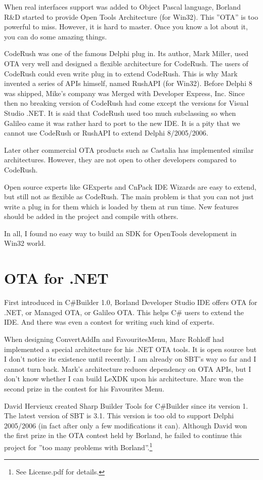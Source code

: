 When real interfaces support was added to Object Pascal language, Borland R\&D
started to provide Open Tools Architecture (for Win32). This ''OTA'' is too
powerful to miss. However, it is hard to master. Once you know a lot about it,
you can do some amazing things.

CodeRush was one of the famous Delphi plug in. Its author, Mark Miller, used OTA
very well and designed a flexible architecture for CodeRush. The users of
CodeRush could even write plug in to extend CodeRush. This is why Mark invented
a series of APIs himself, named RushAPI (for Win32). Before Delphi 8 was
shipped, Mike's company was Merged with Developer Express, Inc. Since then no
breaking version of CodeRush had come except the versions for Visual Studio
.NET. It is said that CodeRush used too much subclassing so when Galileo came it
was rather hard to port to the new IDE. It is a pity that we cannot use CodeRush
or RushAPI to extend Delphi 8/2005/2006.

Later other commercial OTA products such as Castalia has implemented similar 
architectures. However, they are not open to other developers compared to CodeRush.

Open source experts like GExperts and CnPack IDE Wizards are easy to extend, but
still not as flexible as CodeRush. The main problem is that you can not just
write a plug in for them which is loaded by them at run time. New features
should be added in the project and compile with others.

In all, I found no easy way to build an SDK for OpenTools development in Win32
world.

\section{OTA for .NET}
First introduced in C\#Builder 1.0, Borland Developer Studio IDE offers OTA for 
.NET, or Managed OTA, or Galileo OTA. This helps C\# users to extend the IDE.
And there was even a contest for writing such kind of experts.

When designing ConvertAddIn and FavouritesMenu, Marc Rohloff had implemented a 
special architecture for his .NET OTA tools. It is open source but I don't 
notice its existence until recently. I am already on SBT's way so far and I 
cannot turn back. Mark's architecture reduces dependency on OTA APIs, but I 
don't know whether I can build LeXDK upon his architecture. Marc won the second
prize in the contest for his Favourites Menu.

David Hervieux created Sharp Builder Tools for C\#Builder since its version 1. 
The latest version of SBT is 3.1. This version is too old to support Delphi 
2005/2006 (in fact after only a few modifications it can). Although David won 
the first prize in the OTA contest held by Borland, he failed to continue this 
project for ''too many problems with Borland''.\footnote{See License.pdf for 
details.}

